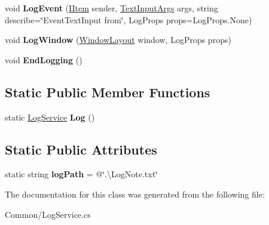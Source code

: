 \begin{DoxyCompactItemize}
void {\bfseries Log\+Event} (\mbox{\hyperlink{interface_space_v_i_l_1_1_core_1_1_i_item}{I\+Item}} sender, \mbox{\hyperlink{class_space_v_i_l_1_1_core_1_1_text_input_args}{Text\+Input\+Args}} args, string describe=\char`\"{}Event\+Text\+Input from\char`\"{}, Log\+Props props=Log\+Props.\+None)
\item 
\mbox{\label{class_space_v_i_l_1_1_common_1_1_log_service_a20fff7679b2d3c8f9e6d1346ba1a0174}} 
void {\bfseries Log\+Window} (\mbox{\hyperlink{class_space_v_i_l_1_1_window_layout}{Window\+Layout}} window, Log\+Props props)
\item 
\mbox{\label{class_space_v_i_l_1_1_common_1_1_log_service_a39281618061b2397f93631f1f40d6dd5}} 
void {\bfseries End\+Logging} ()
\end{DoxyCompactItemize}
\subsection*{Static Public Member Functions}
\begin{DoxyCompactItemize}
\item 
\mbox{\label{class_space_v_i_l_1_1_common_1_1_log_service_a4d09d60a84099827f19ac6cc79a01d9e}} 
static \mbox{\hyperlink{class_space_v_i_l_1_1_common_1_1_log_service}{Log\+Service}} {\bfseries Log} ()
\end{DoxyCompactItemize}
\subsection*{Static Public Attributes}
\begin{DoxyCompactItemize}
\item 
\mbox{\label{class_space_v_i_l_1_1_common_1_1_log_service_aae21c99babd1e07b685fc01ed5052bf9}} 
static string {\bfseries log\+Path} = @\char`\"{}.\textbackslash{}Log\+Note.\+txt\char`\"{}
\end{DoxyCompactItemize}


The documentation for this class was generated from the following file\+:\begin{DoxyCompactItemize}
\item 
Common/Log\+Service.\+cs\end{DoxyCompactItemize}
